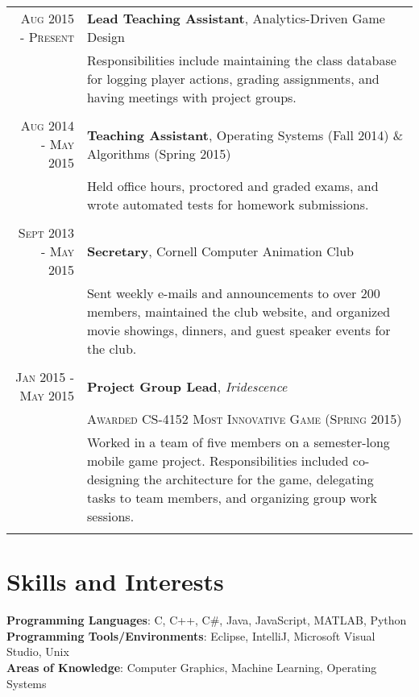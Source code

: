\documentclass[a4paper,10pt]{article} %
\begin{document}
\begin{tabular}{r|p{11cm}}

\textsc{Aug 2015 - Present} & \textbf{Lead Teaching Assistant}, Analytics-Driven Game Design \\
& \footnotesize{Responsibilities include maintaining the class database for logging player actions, grading assignments, and having meetings with project groups.}\\
\multicolumn{2}{c}{} \\


\textsc{Aug 2014 - May 2015} & \textbf{Teaching Assistant}, Operating Systems (Fall 2014) \& Algorithms (Spring 2015) \\
& \footnotesize{Held office hours, proctored and graded exams, and wrote automated tests for homework submissions.}\\
\multicolumn{2}{c}{} \\


\textsc{Sept 2013 - May 2015} & \textbf{Secretary}, Cornell Computer Animation Club\\
& \footnotesize{Sent weekly e-mails and announcements to over 200 members, maintained the club website, and organized movie showings, dinners, and guest speaker events for the club.}\\
\multicolumn{2}{c}{} \\


\textsc{Jan 2015 - May 2015} & \textbf{Project Group Lead}, \textit{Iridescence}\\
& \textsc{Awarded CS-4152 Most Innovative Game (Spring 2015)}\\
& \footnotesize{Worked in a team of five members on a semester-long mobile game project. Responsibilities included co-designing the architecture for the game, delegating tasks to team members, and organizing group work sessions.}\\
\multicolumn{2}{c}{} \\

\end{tabular}


\section{Skills and Interests}

\textbf{Programming Languages}: C, C++, C\#, Java, JavaScript, MATLAB, Python\\
\textbf{Programming Tools/Environments}: Eclipse, IntelliJ, Microsoft Visual Studio, Unix\\
\textbf{Areas of Knowledge}: Computer Graphics, Machine Learning, Operating Systems

\end{document}
